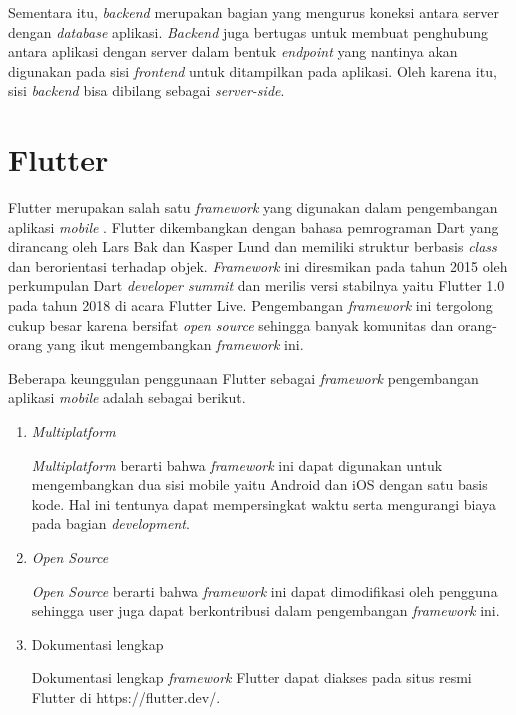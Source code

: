 \begin{spacing}{1.5}
Sementara itu, \textit{backend} merupakan bagian yang mengurus koneksi antara server dengan \textit{database} aplikasi. \textit{Backend} juga bertugas untuk membuat penghubung antara aplikasi dengan server dalam bentuk \textit{endpoint} yang nantinya akan digunakan pada sisi \textit{frontend} untuk ditampilkan pada aplikasi. Oleh karena itu, sisi \textit{backend} bisa dibilang sebagai \textit{server-side}.

\section{Flutter}

Flutter merupakan salah satu \textit{framework} yang digunakan dalam pengembangan aplikasi \textit{mobile} \citep{flutterweb}. Flutter dikembangkan dengan bahasa pemrograman Dart yang dirancang oleh Lars Bak dan Kasper Lund dan memiliki struktur berbasis \textit{class} dan berorientasi terhadap objek. \textit{Framework} ini diresmikan pada tahun 2015 oleh perkumpulan Dart \textit{developer summit}  dan merilis versi stabilnya yaitu Flutter 1.0 pada tahun 2018 di acara Flutter Live. Pengembangan \textit{framework} ini tergolong cukup besar karena bersifat \textit{open source} sehingga banyak komunitas dan orang-orang yang ikut mengembangkan \textit{framework} ini.

Beberapa keunggulan penggunaan Flutter sebagai \textit{framework} pengembangan aplikasi \textit{mobile} adalah sebagai berikut.

\begin{enumerate}
	\item \textit{Multiplatform}
	
	\textit{Multiplatform} berarti bahwa \textit{framework} ini dapat digunakan untuk mengembangkan dua sisi mobile yaitu Android dan iOS dengan satu basis kode. Hal ini tentunya dapat mempersingkat waktu serta mengurangi biaya pada bagian \textit{development}.

	\item \textit{Open Source}
	
	\textit{Open Source} berarti bahwa \textit{framework} ini dapat dimodifikasi oleh pengguna sehingga user juga dapat berkontribusi dalam pengembangan \textit{framework} ini.

	\item Dokumentasi lengkap
	
	Dokumentasi lengkap \textit{framework} Flutter dapat diakses pada situs resmi Flutter di https://flutter.dev/.
\end{enumerate}


\end{spacing}
